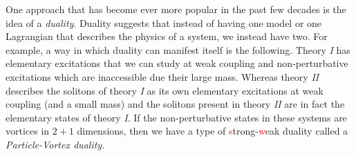     One approach that has become ever more popular in the past few decades is the idea of a \textit{duality}. Duality suggests that instead of having one model or one Lagrangian that describes the physics of a system, we instead have two. For example, a way in which duality can manifest itself is the following. Theory \textit{I} has elementary excitations that we can study at weak coupling and non-perturbative excitations which are inaccessible due their large mass. Whereas theory \textit{II} describes the solitons of theory \textit{I} as its own elementary excitations at weak coupling (and a small mass) and the solitons present in theory \textit{II} are in fact the elementary states of theory \textit{I}. If the non-perturbative states in these systems are vortices in $2+1$ dimensions, then we have a type of \textcolor{red}{s}trong-\textcolor{red}{w}eak duality called a \textit{Particle-Vortex duality}. 

